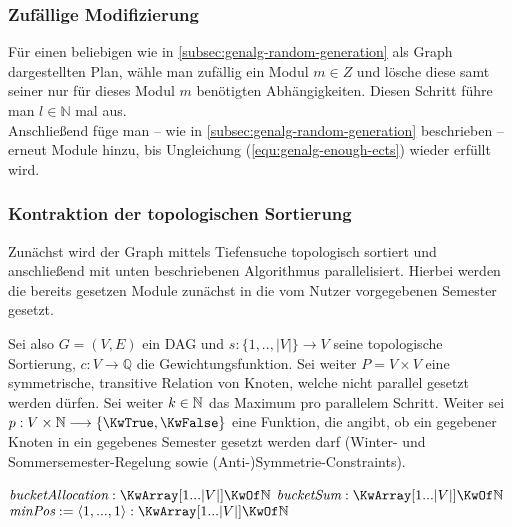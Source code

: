 \subsubsection{Zufällige Modifizierung}
\label{subsec:genalg-random-modification}
Für einen beliebigen wie in \ref{subsec:genalg-random-generation} als Graph dargestellten Plan, wähle man zufällig ein Modul $m \in Z$ und lösche diese samt seiner nur für dieses Modul $m$ benötigten Abhängigkeiten. Diesen Schritt führe man $l \in \mathbb{N}$ mal aus.\\
Anschließend füge man -- wie in \ref{subsec:genalg-random-generation} beschrieben -- erneut Module hinzu, bis Ungleichung (\ref{equ:genalg-enough-ects}) wieder erfüllt wird.

\subsubsection{Kontraktion der topologischen Sortierung}
\label{subsec:genalg-contract-topolog-sort}
Zunächst wird der Graph mittels Tiefensuche topologisch sortiert und
anschließend  mit unten beschriebenen Algorithmus parallelisiert.
Hierbei werden die bereits gesetzen Module zunächst in die vom Nutzer vorgegebenen Semester gesetzt.

Sei also $G = (V,E)$ ein DAG und $s: \{1,..,|V|\} \to V$ seine topologische Sortierung, $c: V \to \mathbb{Q}$ die Gewichtungsfunktion. Sei weiter $P = V \times V$ eine symmetrische, transitive Relation von Knoten, welche nicht parallel gesetzt werden dürfen.
Sei weiter $ k \in \mathbb{N} $ das Maximum pro parallelem Schritt.
Weiter sei $ p: V \times \NN \to \{\KwTrue, \KwFalse\} $ eine Funktion, die angibt, ob ein gegebener Knoten in ein gegebenes Semester gesetzt werden darf (Winter- und Sommersemester-Regelung sowie (Anti-)Symmetrie-Constraints).

\begin{algorithm}
	$\Var{bucketAllocation} : \KwArray [1...|V|] \KwOf \NN $ \;
	$\Var{bucketSum} : \KwArray [1...|V|] \KwOf \NN $ \;
	$\Var{minPos} := \langle 1,...,1 \rangle: \KwArray [1...|V|] \KwOf \NN $ \;
	\BlankLine
\end{algorithm}

